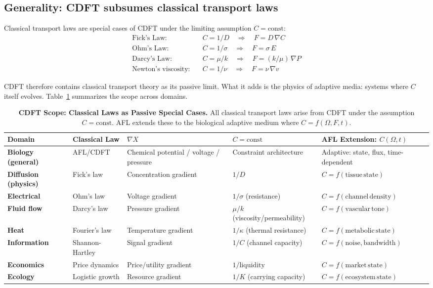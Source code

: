\documentclass[11pt]{article}
\newcommand{\Om}{\Omega}
\begin{document}
\subsection{Generality: CDFT subsumes classical transport laws}

Classical transport laws are special cases of CDFT under the limiting assumption $C = \mathrm{const}$:
\begin{align}
\text{Fick's Law:}& \quad C = 1/D \quad \Rightarrow \quad F = D\,\nabla C \label{eq:fick}\\
\text{Ohm's Law:}& \quad C = 1/\sigma \quad \Rightarrow \quad F = \sigma\,E \\
\text{Darcy's Law:}& \quad C = \mu/k \quad \Rightarrow \quad F = (k/\mu)\,\nabla P \\
\text{Newton's viscosity:}& \quad C = 1/\nu \quad \Rightarrow \quad F = \nu\,\nabla v
\end{align}

CDFT therefore contains classical transport theory as its passive limit. What it adds is the physics of adaptive media: systems where $C$ itself evolves. Table~\ref{tab:cdft_scope} summarizes the scope across domains.

\begin{table}[H]
\centering
\caption{\textbf{CDFT Scope: Classical Laws as Passive Special Cases.}
All classical transport laws arise from CDFT under the assumption $C = \mathrm{const}$.
AFL extends these to the biological adaptive medium where $C = f(\Om, F, t)$.}
\label{tab:cdft_scope}
\small
\setlength{\tabcolsep}{4pt}
\begin{tabularx}{\linewidth}{>{\bfseries}lXXXX}
\toprule
Domain & Classical Law & $\nabla X$ & $C = \mathrm{const}$ & AFL Extension: $C(\Om,t)$ \\
\midrule
Biology (general) & AFL/CDFT & Chemical potential / voltage / pressure & Constraint architecture & Adaptive: state, flux, time-dependent \\[2pt]
Diffusion (physics) & Fick's law & Concentration gradient & $1/D$ & $C = f(\mathrm{tissue\,state})$ \\[2pt]
Electrical & Ohm's law & Voltage gradient & $1/\sigma$ (resistance) & $C = f(\mathrm{channel\,density})$ \\[2pt]
Fluid flow & Darcy's law & Pressure gradient & $\mu/k$ (viscosity/permeability) & $C = f(\mathrm{vascular\,tone})$ \\[2pt]
Heat & Fourier's law & Temperature gradient & $1/\kappa$ (thermal resistance) & $C = f(\mathrm{metabolic\,state})$ \\[2pt]
Information & Shannon-Hartley & Signal gradient & $1/C$ (channel capacity) & $C = f(\mathrm{noise, bandwidth})$ \\[2pt]
Economics & Price dynamics & Price/utility gradient & $1/\mathrm{liquidity}$ & $C = f(\mathrm{market\,state})$ \\[2pt]
Ecology & Logistic growth & Resource gradient & $1/K$ (carrying capacity) & $C = f(\mathrm{ecosystem\,state})$ \\
\bottomrule
\end{tabularx}
\end{table}
\end{document}
